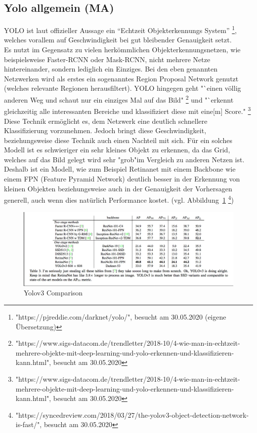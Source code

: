 \documentclass[a4paper,oneside,12pt]{report}
\begin{document}
\begin{onehalfspace}
		\subsection{Yolo allgemein (MA)}
		YOLO ist laut offizieller Aussage ein "`Echtzeit Objekterkennungs System"'
		\footnote{"https://pjreddie.com/darknet/yolo/", besucht am 30.05.2020 (eigene Übersetzung)},
		welches vorallem auf Geschwindigkeit bei gut bleibender Genauigkeit setzt.\\
		Es nutzt im Gegensatz zu vielen herkömmlichen Objekterkennungsnetzen, wie beispielsweise Faster-RCNN oder Mask-RCNN, nicht mehrere Netze hintereinander, sondern lediglich ein Einziges. Bei den eben genannten Netzwerken wird als erstes ein sogenanntes Region Proposal Network genutzt (welches relevante Regionen herausfiltert). YOLO hingegen geht "`einen völlig anderen Weg und schaut nur ein einziges Mal auf das Bild"
		\footnote{"https://www.sigs-datacom.de/trendletter/2018-10/4-wie-man-in-echtzeit-mehrere-objekte-mit-deep-learning-und-yolo-erkennen-und-klassifizieren-kann.html", besucht am 30.05.2020}
		und "`erkennt gleichzeitig alle interessanten Bereiche und klassifiziert diese mit eine[m] Score."
		\footnote{"https://www.sigs-datacom.de/trendletter/2018-10/4-wie-man-in-echtzeit-mehrere-objekte-mit-deep-learning-und-yolo-erkennen-und-klassifizieren-kann.html", besucht am 30.05.2020}\\
		Diese Technik ermöglicht es, dem Netzwerk eine deutlich schnellere Klassifizierung vorzunehmen. 
		Jedoch bringt diese Geschwindigkeit, beziehungsweise diese Technik auch einen Nachteil mit sich. Für ein solches Modell ist es schwieriger ein sehr kleines Objekt zu erkennen, da das Grid, welches auf das Bild gelegt wird sehr "grob"\space im Vergleich zu anderen Netzen ist. \\
		Deshalb ist ein Modell, wie zum Beispiel Retinanet mit einem Backbone wie einem FPN (Feature Pyramid Network) deutlich besser in der Erkennung von kleinen Objekten beziehungsweise auch in der Genauigkeit der Vorhersagen generell, auch wenn dies natürlich Performance kostet. (vgl. Abbildung~\ref{fig:comparison}
		\footnote{"https://syncedreview.com/2018/03/27/the-yolov3-object-detection-network-is-fast/", besucht am 30.05.2020})\\
		\begin{figure}[h!]
			\includegraphics[width=\linewidth]{Comparison.png}
			\caption{Yolov3 Comparison}
			\label{fig:comparison}
		\end{figure}

\end{onehalfspace}
\end{document}
